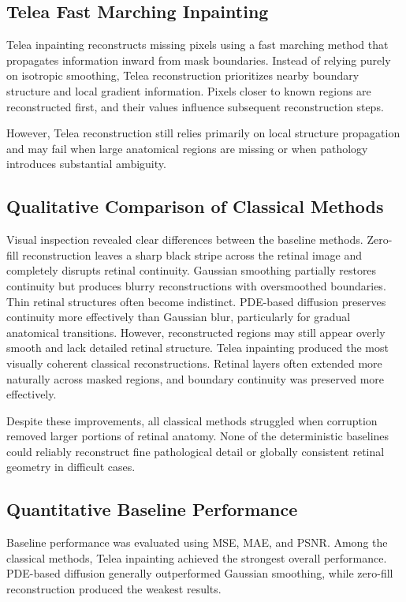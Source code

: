 \documentclass[12pt,oneside]{article}
\begin{document}
\subsection{Telea Fast Marching Inpainting}

Telea inpainting reconstructs missing pixels using a fast marching method that propagates information inward from mask boundaries.
Instead of relying purely on isotropic smoothing, Telea reconstruction prioritizes nearby boundary structure and local gradient information. Pixels closer to known regions are reconstructed first, and their values influence subsequent reconstruction steps.

However, Telea reconstruction still relies primarily on local structure propagation and may fail when large anatomical regions are missing or when pathology introduces substantial ambiguity.

\subsection*{Qualitative Comparison of Classical Methods}

Visual inspection revealed clear differences between the baseline methods.
Zero-fill reconstruction leaves a sharp black stripe across the retinal image and completely disrupts retinal continuity.
Gaussian smoothing partially restores continuity but produces blurry reconstructions with oversmoothed boundaries. Thin retinal structures often become indistinct.
PDE-based diffusion preserves continuity more effectively than Gaussian blur, particularly for gradual anatomical transitions. However, reconstructed regions may still appear overly smooth and lack detailed retinal structure.
Telea inpainting produced the most visually coherent classical reconstructions. Retinal layers often extended more naturally across masked regions, and boundary continuity was preserved more effectively.

Despite these improvements, all classical methods struggled when corruption removed larger portions of retinal anatomy. None of the deterministic baselines could reliably reconstruct fine pathological detail or globally consistent retinal geometry in difficult cases.

\subsection*{Quantitative Baseline Performance}

Baseline performance was evaluated using MSE, MAE, and PSNR.
Among the classical methods, Telea inpainting achieved the strongest overall performance. PDE-based diffusion generally outperformed Gaussian smoothing, while zero-fill reconstruction produced the weakest results.
\end{document}
